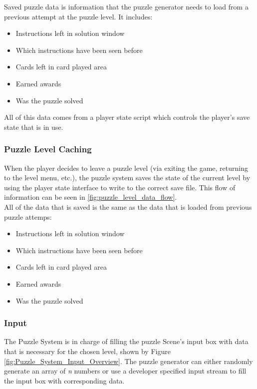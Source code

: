 Saved puzzle data is information that the puzzle generator needs to load from a previous attempt
at the puzzle level. It includes:
\begin{itemize}
  \item Instructions left in solution window
  \item Which instructions have been seen before
  \item Cards left in card played area
  \item Earned awards
  \item Was the puzzle solved
\end{itemize}

All of this data comes from a player state script which controls the player's save state that is in
use.

\subsubsection{Puzzle Level Caching}
When the player decides to leave a puzzle level (via exiting the game, returning to the
level menu, etc.), the puzzle system saves the state of the current level by using the player
state interface to write to the correct save file. This flow of information can be seen in
\ref{fig:puzzle_level_data_flow}.\\

All of the data that is saved is the same as the data that is loaded from previous puzzle attemps:
\begin{itemize}
  \item Instructions left in solution window
  \item Which instructions have been seen before
  \item Cards left in card played area
  \item Earned awards
  \item Was the puzzle solved
\end{itemize}

\subsubsection{Input}
The Puzzle System is in charge of filling the puzzle Scene's input box with data
that is necessary for the chosen level, shown by Figure \ref{fig:Puzzle_System_Input_Overview}.
The puzzle generator can either randomly generate an array of \textit{n} numbers or use a developer
specified input stream to fill the input box with corresponding data.\\


